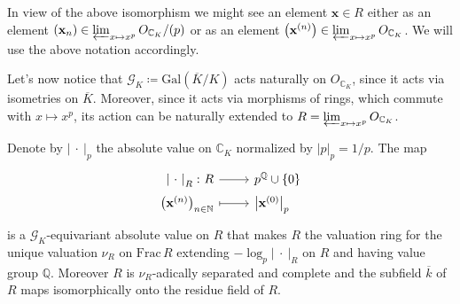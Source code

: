 \begin{ntt}[]\label{not:tiltingElts}
	In view of the above isomorphism we might see an element $\mathbf{x} \in R$
	either as an element 
	$\left( \mathbf{x}_n \right) \in \varprojlim_{x \mapsto x^p} O_{\mathbb{C}_K}/ (p)$
	or as an element
	$\left( \mathbf{x}^{(n)} \right) \in \varprojlim_{x \mapsto x^p} O_{\mathbb{C}_K}$.
	We will use the above notation accordingly.
\end{ntt}


\begin{rem}[]\label{rem:GKActionR}
	Let's now notice that $\mathscr{G}_K \coloneqq \mathrm{Gal}\left( \overline{K} / K \right)$
	acts naturally on $O_{\mathbb{C}_K}$, since it acts via isometries on
	$\overline{K}$.
	Moreover, since it acts via morphisms of rings, which commute with $x \mapsto x^p$,
	its action can be naturally extended to
	$R = \varprojlim_{x \mapsto x^p} O_{\mathbb{C}_K}$.
\end{rem}


\begin{lem}
	Denote by $\left| \ \cdot \ \right|_p$ the absolute value on $\mathbb{C}_K$
	normalized by $\left| p \right|_p = 1/p$.
	The map
	\begin{equation*}
	\begin{tikzcd}[row sep = 0ex
		,/tikz/column 1/.append style={anchor=base east}
		,/tikz/column 2/.append style={anchor=base west}]
		\left| \ \cdot \ \right|_R\colon R \arrow[r, "", rightarrow] &
		p^{\mathbb{Q}} \cup \left\{ 0 \right\} \\
		\left( \mathbf{x}^{(n)} \right)_{n \in \mathbb{N}} \arrow[r, "", mapsto] & 
		\left| \mathbf{x}^{(0)} \right|_p
	\end{tikzcd}
	\end{equation*} 
	is a $\mathscr{G}_K$-equivariant absolute value on $R$ that makes
	$R$ the valuation ring for the unique valuation
	$\nu_R$ on $\mathrm{Frac}\, R$ extending
	$-\log_p \left| \ \cdot \ \right|_R$ on $R$
	and having value group $\mathbb{Q}$.
	Moreover $R$ is $\nu_R$-adically separated and complete
	and the subfield $\overline{k}$ of $R$ maps
	isomorphically onto the residue field of $R$.
\end{lem} 


